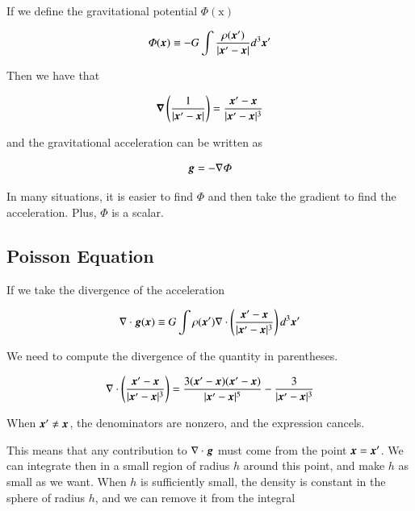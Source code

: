 If we define the gravitational potential $\varPhi(\mathrm{x})$

\begin{equation}
\varPhi({\boldsymbol{x}}) \equiv - G \int \frac{\rho({\boldsymbol{x}}^\prime)}{|{\boldsymbol{x}}^\prime-{\boldsymbol{x}}|}  d^3{\boldsymbol{x}}^\prime
\end{equation}

Then we have that

\begin{equation}
{\boldsymbol{\nabla}} \left( \frac{1}{|{\boldsymbol{x}}^\prime-{\boldsymbol{x}}|} \right) = \frac{{\boldsymbol{x}}^\prime - {\boldsymbol{x}}}{|{\boldsymbol{x}}^\prime-{\boldsymbol{x}}|^3} 
\end{equation}

and the gravitational acceleration can be written as 

\begin{equation}
{\boldsymbol{g}} = -\nabla \varPhi
\end{equation}

In many situations, it is easier to find $\varPhi$ and then take the gradient to find the acceleration. Plus, $\varPhi$ is a scalar.


\subsection{Poisson Equation}

If we take the divergence of the acceleration

\begin{equation}
\nabla \cdot {\boldsymbol{g}}({\boldsymbol{x}}) \equiv  G \int \rho({\boldsymbol{x}}^\prime)  \nabla \cdot \left( \frac{{\boldsymbol{x}}^\prime - {\boldsymbol{x}}}{|{\boldsymbol{x}}^\prime-{\boldsymbol{x}}|^3} \right) d^3{\boldsymbol{x}}^\prime
\end{equation}

We need to compute the divergence of the quantity in parentheses. 

\begin{equation}
\nabla \cdot \left( \frac{{\boldsymbol{x}}^\prime - {\boldsymbol{x}}}{|{\boldsymbol{x}}^\prime-{\boldsymbol{x}}|^3} \right) = \frac{3({\boldsymbol{x}}^\prime-{\boldsymbol{x}})({\boldsymbol{x}}^\prime-{\boldsymbol{x}})}{|{\boldsymbol{x}}^\prime-{\boldsymbol{x}}|^5} - \frac{3}{|{\boldsymbol{x}}^\prime-{\boldsymbol{x}}|^3}
\end{equation}

When ${\boldsymbol{x}}^\prime\neq {\boldsymbol{x}}$, the denominators are nonzero, and the expression cancels. 

This means that any contribution to $\nabla\cdot {\boldsymbol{g}}$ must come from the point ${\boldsymbol{x}}={\boldsymbol{x}}^\prime$. We can integrate then in a small region of radius $h$ around this point, and make $h$ as small as we want. When $h$ is sufficiently small, the density is constant in the sphere of radius $h$, and we can remove it from the integral

